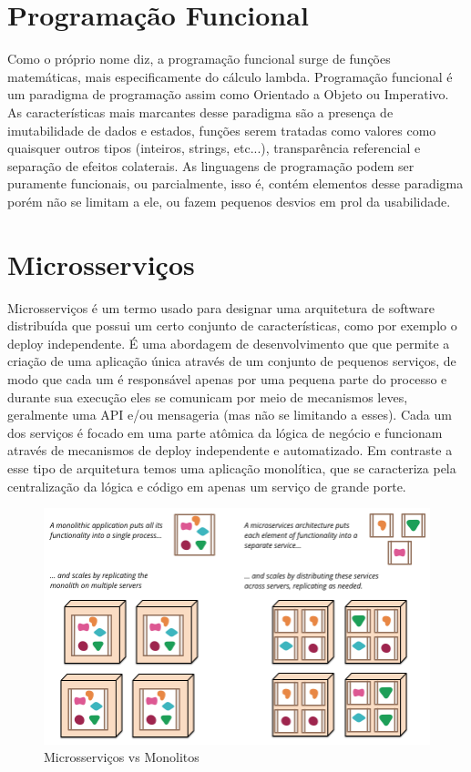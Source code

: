 	\section{Programação Funcional}
	
	Como o próprio nome diz, a programação funcional surge de funções matemáticas, mais especificamente do cálculo lambda. Programação funcional é um paradigma de programação assim como Orientado a Objeto ou Imperativo. As características mais marcantes desse paradigma são a presença de imutabilidade de dados e estados, funções serem tratadas como valores como quaisquer outros tipos (inteiros, strings, etc...), transparência referencial e separação de efeitos colaterais.
	As linguagens de programação podem ser puramente funcionais, ou parcialmente, isso é, contém elementos desse paradigma porém não se limitam a ele, ou fazem pequenos desvios em prol da usabilidade.
	
	\section{Microsserviços}
	
	Microsserviços é um termo usado para designar uma arquitetura de software distribuída que possui um certo conjunto de características, como por exemplo o deploy independente. É uma abordagem de desenvolvimento que que permite a criação de uma aplicação única através de um conjunto de pequenos serviços, de modo que cada um é responsável apenas por uma pequena parte do processo e durante sua execução eles se comunicam por meio de mecanismos leves, geralmente uma API e/ou mensageria (mas não se limitando a esses). Cada um dos serviços é focado em uma parte atômica da lógica de negócio e funcionam através de mecanismos de deploy independente e automatizado. Em contraste a esse tipo de arquitetura temos uma aplicação monolítica, que se caracteriza pela centralização da lógica e código em apenas um serviço de grande porte. \cite{microsservicos}
	
	\begin{figure}[htpb]
	    \caption{Microsserviços vs Monolitos}
	    \begin{center}
	        \includegraphics[scale=0.4]{pictures/sketch_microservices.png}
	    \end{center}
	    \label{fig:microsservicos_vs_monolito}
	\end{figure}

